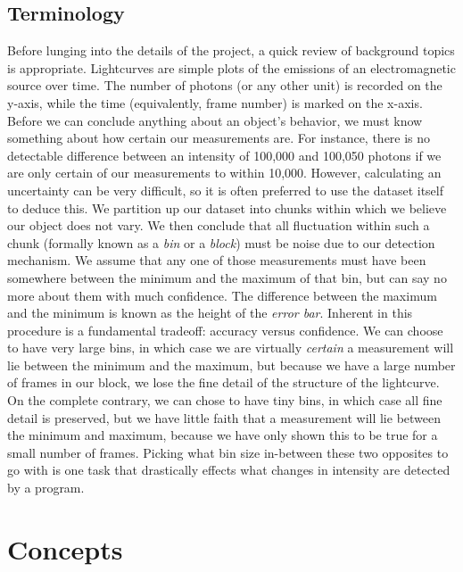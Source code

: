 \documentclass[12pt]{article}
\begin{document}
\subsection{Terminology}
\indent \indent Before lunging into the details of the project, a quick review of background topics is appropriate. Lightcurves are simple plots of the emissions of an electromagnetic source over time. The number of photons (or any other unit) is recorded on the y-axis, while the time (equivalently, frame number) is marked on the x-axis. Before we can conclude anything about an object's behavior, we must know something about how certain our measurements are. For instance, there is no detectable difference between an intensity of 100,000 and 100,050 photons if we are only certain of our measurements to within 10,000. However, calculating an uncertainty can be very difficult, so it is often preferred to use the dataset itself to deduce this. We partition up our dataset into chunks within which we believe our object does not vary. We then conclude that all fluctuation within such a chunk (formally known as a \textit{bin} or a \textit{block}) must be noise due to our detection mechanism. We assume that any one of those measurements must have been somewhere between the minimum and the maximum of that bin, but can say no more about them with much confidence. The difference between the maximum and the minimum is known as the height of the \textit{error bar}.
\newline
\indent Inherent in this procedure is a fundamental tradeoff: accuracy versus confidence. We can choose to have very large bins, in which case we are virtually \textit{certain} a measurement will lie between the minimum and the maximum, but because we have a large number of frames in our block, we lose the fine detail of the structure of the lightcurve. On the complete contrary, we can chose to have tiny bins, in which case all fine detail is preserved, but we have little faith that a measurement will lie between the minimum and maximum, because we have only shown this to be true for a small number of frames. Picking what bin size in-between these two opposites to go with is one task that drastically effects what changes in intensity are detected by a program.
\section{Concepts}
\end{document}
